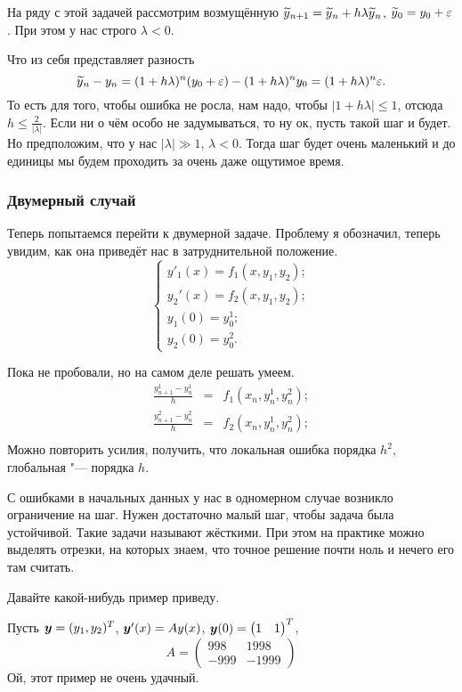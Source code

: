 На ряду с этой задачей рассмотрим возмущённую $\widetilde{y}{}_{n+1} = \widetilde{y}{}_n + h\lambda \widetilde{y}{}_n$, $\widetilde{y}{}_0 = y_0 + \varepsilon$. При этом у нас строго $\lambda<0$.

Что из себя представляет разность
\[
  \widetilde{y}{}_n - y_n = (1 + h\lambda)^n(y_0+\varepsilon) - (1+ h\lambda)^n y_0 = (1 + h\lambda)^n\varepsilon.
\]
То есть для того, чтобы ошибка не росла, нам надо, чтобы $|1+h\lambda|\le 1$, отсюда $h\le \frac{2}{|\lambda|}$. Если ни о чём особо не задумываться, то ну ок, пусть такой шаг и будет. Но предположим, что у нас $|\lambda|\gg1$, $\lambda<0$. Тогда шаг будет очень маленький и до единицы мы будем проходить за очень даже ощутимое время.

\subsubsection{Двумерный случай}
Теперь попытаемся перейти к двумерной задаче. Проблему я обозначил, теперь увидим, как она приведёт нас в затруднительной положение.
\begin{equation*}
\begin{cases}
y'_1(x) = f_1(x,y_1,y_2);\\
y_2'(x) = f_2(x,y_1,y_2);\\
y_1(0) = y_0^1;\\
y_2(0) = y_0^2.
\end{cases}
\end{equation*}

Пока не пробовали, но на самом деле решать умеем.
\begin{eqnarray*}
\frac{y_{n+1}^1 - y_n^1}{h} &=&  f_1(x_n,y^1_n,y_n^2);\\
\frac{y_{n+1}^2 - y_n^2}{h} &=&  f_2(x_n,y^1_n,y_n^2);\\
\end{eqnarray*}
Можно повторить усилия, получить, что локальная ошибка порядка $h^2$, глобальная "--- порядка $h$.

С ошибками в начальных данных у нас в одномерном случае возникло ограничение на шаг. Нужен достаточно малый шаг, чтобы задача была устойчивой. Такие задачи называют жёсткими. При этом на практике можно выделять отрезки, на которых знаем, что точное решение почти ноль и нечего его там считать.

Давайте какой-нибудь пример приведу.

Пусть $\boldsymbol{y} = (y_1,y_2)^T$, $\boldsymbol{y}'(x) = A y(x)$, $\boldsymbol{y}(0) = \begin{pmatrix}
1 & 1
\end{pmatrix}^T$,
\[
  A = \begin{pmatrix}
998 & 1998 \\
-999 & -1999
\end{pmatrix}
\]
Ой, этот пример не очень удачный.

